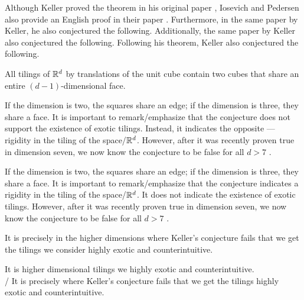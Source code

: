 \documentclass[../thesis.tex]{subfiles}
\begin{document}
Although Keller proved the theorem in his original paper \cite{kellerUberLuckenloseErfullung1930}, Iosevich and Pedersen also provide an English proof in their paper \cite{iosevichSpectralTilingProperties1998}. Furthermore, in the same paper by Keller, he also conjectured the following. \SigridChange{/} Additionally, the same paper by Keller also conjectured the following. \SigridChange{/} Following his theorem, Keller also conjectured the following. %

\begin{conjecture}
    All tilings of $\mathbb{R}^d$ by translations of the unit cube contain two cubes that share an entire $(d-1)$-dimensional face.
\end{conjecture}

If the dimension is two, the squares share an edge; if the dimension is three, they share a face. It is important to remark/emphasize that the conjecture does not support the existence of exotic tilings. Instead, it indicates the opposite — rigidity in the tiling of the space/$\mathbb{R}^d$. However, after it was recently proven true in dimension seven, we now know the conjecture to be false for all $d>7$ \cite{brakensiekResolutionKellerConjecture2020}. 


If the dimension is two, the squares share an edge; if the dimension is three, they share a face. It is important to remark/emphasize that the conjecture indicates a rigidity in the tiling of the space/$\mathbb{R}^d$. It does not indicate the existence of exotic tilings. However, after it was recently proven true in dimension seven, we now know the conjecture to be false for all $d>7$ \cite{brakensiekResolutionKellerConjecture2020}.


It is precisely in the higher dimensions where Keller's conjecture fails that we get the tilings we consider highly exotic and counterintuitive.


It is  higher dimensional tilings we  highly exotic and counterintuitive.\\
/ It is precisely where Keller's conjecture fails that we get the tilings  highly exotic and counterintuitive. %
\end{document}
